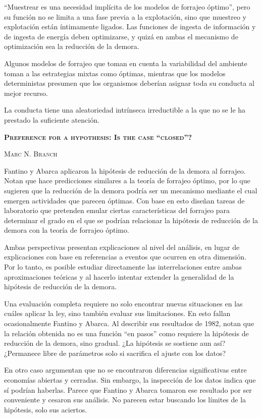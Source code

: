 \documentclass[a4paper,12pt]{article}
\begin{document}
``Muestrear es una necesidad implícita de los modelos de forrajeo óptimo'', pero su función no se limita a una fase previa a la explotación, sino que muestreo y explotación están íntimamente ligados. Las funciones de ingesta de información y de ingesta de energía deben optimizarse, y quizá en ambas el mecanismo de optimización sea la reducción de la demora.

Algunos modelos de forrajeo que toman en cuenta la variabilidad del ambiente toman a las estrategias mixtas como óptimas, mientras que los modelos deterministas presumen que los organismos deberían asignar toda su conducta al mejor recurso.

La conducta tiene una aleatoriedad intrínseca irreductible a la que no se le ha prestado la suficiente atención.

{\scshape\bfseries Preference for a hypothesis: Is the case ``closed''?}

{\scshape Marc N. Branch}

Fantino y Abarca aplicaron la hipótesis de reducción de la demora al forrajeo. Notan que hace predicciones similares a la teoría de forrajeo óptimo, por lo que sugieren que la reducción de la demora podría ser un mecanismo mediante el cual emergen actividades que parecen óptimas. Con base en esto diseñan tareas de laboratorio que pretenden emular ciertas características del forrajeo para determinar el grado en el que se podrían relacionar la hipótesis de reducción de la demora con la teoría de forrajeo óptimo.

Ambas perspectivas presentan explicaciones al nivel del análisis, en lugar de explicaciones con base en referencias a eventos que ocurren en otra dimensión. Por lo tanto, es posible estudiar directamente las interrelaciones entre ambas aproximaciones teóricas y al hacerlo intentar extender la generalidad de la hipótesis de reducción de la demora.

Una evaluación completa requiere no solo encontrar nuevas situaciones en las cuáles aplicar la ley, sino también evaluar sus limitaciones. En esto fallan ocasionalmente Fantino y Abarca. Al describir sus resultados de 1982, notan que la relación obtenida no es una función ``en pasos'' como requiere la hipótesis de reducción de la demora, sino gradual. ¿La hipótesis se sostiene aun así? ¿Permanece libre de parámetros solo si sacrifica el ajuste con los datos?

En otro caso argumentan que no se encontraron diferencias significativas entre economías abiertas y cerradas. Sin embargo, la inspección de los datos indica que sí podrían haberlas. Parece que Fantino y Abarca tomaron ese resultado por ser conveniente y cesaron sus análisis. No parecen estar buscando los límites de la hipótesis, solo sus aciertos.
\end{document}
